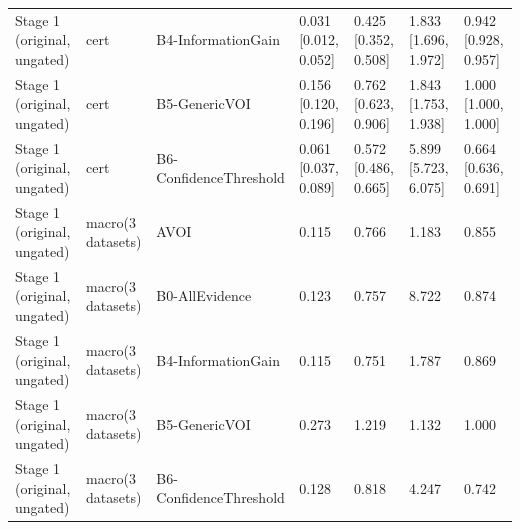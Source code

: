 \begin{table}[!ht]
{\begin{tabular}{lllllll}
Stage 1 (original, ungated) & cert & B4-InformationGain & 0.031 [0.012, 0.052] & 0.425 [0.352, 0.508] & 1.833 [1.696, 1.972] & 0.942 [0.928, 0.957] \\
Stage 1 (original, ungated) & cert & B5-GenericVOI & 0.156 [0.120, 0.196] & 0.762 [0.623, 0.906] & 1.843 [1.753, 1.938] & 1.000 [1.000, 1.000] \\
Stage 1 (original, ungated) & cert & B6-ConfidenceThreshold & 0.061 [0.037, 0.089] & 0.572 [0.486, 0.665] & 5.899 [5.723, 6.075] & 0.664 [0.636, 0.691] \\
Stage 1 (original, ungated) & macro(3 datasets) & AVOI & 0.115 & 0.766 & 1.183 & 0.855 \\
Stage 1 (original, ungated) & macro(3 datasets) & B0-AllEvidence & 0.123 & 0.757 & 8.722 & 0.874 \\
Stage 1 (original, ungated) & macro(3 datasets) & B4-InformationGain & 0.115 & 0.751 & 1.787 & 0.869 \\
Stage 1 (original, ungated) & macro(3 datasets) & B5-GenericVOI & 0.273 & 1.219 & 1.132 & 1.000 \\
Stage 1 (original, ungated) & macro(3 datasets) & B6-ConfidenceThreshold & 0.128 & 0.818 & 4.247 & 0.742 \\
\bottomrule
\end{tabular}}
\end{table}
